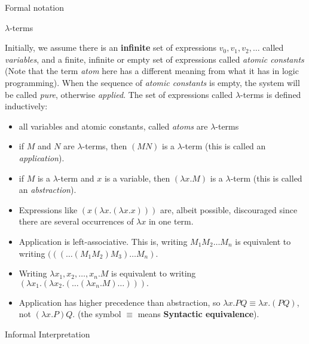 \documentclass{beamer}
\newcommand{\lam}{{$\lambda$}}
\newcommand{\lambdaterms}{{\lam-terms}}
\newcommand{\lambdaterm}{{\lam-term}}
\begin{document}
  \begin{section}{Formal notation}
    \begin{subsection}{\lambdaterms{}}
      \begin{frame}
        Initially, we assume there is an \textbf{infinite} set of expressions $v_0, v_1, v_2, \ldots$ called \textit{variables}, and a finite, infinite or empty set of expressions called \textit{atomic constants} (Note that the term \textit{atom} here has a different meaning from what it has in logic programming). When the sequence of \textit{atomic constants} is empty, the system will be called \textit{pure}, otherwise \textit{applied}. The set of expressions called \lambdaterms{} is defined inductively:
        \begin{itemize}[a]
        \item<1-> all variables and atomic constants, called \textit{atoms} are \lambdaterms{}
        \item<2-> if $M$ and $N$ are \lambdaterms{}, then $(M N)$ is a \lambdaterm{} (this is called an \textit{application}).
        \item<3-> if $M$ is a \lambdaterm{} and $x$ is a variable, then $(\lambda x. M)$ is a \lambdaterm{} (this is called an \textit{abstraction}).
        \end{itemize}
      \end{frame}
      \begin{frame}
        \begin{itemize}
        \item<1->Expressions like $(x (\lambda x. (\lambda x. x)))$ are, albeit possible, discouraged since there are several occurrences of $\lambda x$ in one term.
        \item<2->Application is left-associative. This is, writing $M_1 M_2 \ldots M_n$ is equivalent to writing $(((\ldots(M_1 M_2) M_3 )\ldots M_n)$.
        \item<3->Writing $\lambda x_1,x_2,\ldots,x_n.M$ is equivalent to writing $(\lambda x_1.(\lambda x_2.(\ldots(\lambda x_n.M)\ldots))).$
        \item<4->Application has higher precedence than abstraction, so $\lambda x . P Q \equiv \lambda x . (P Q)$, not $(\lambda x.P)Q$. (the symbol $\equiv$ means \textbf{Syntactic equivalence}).
        \end{itemize}
      \end{frame}
    \end{subsection}
    \begin{subsection}{Informal Interpretation}

\end{subsection}
\end{section}
\end{document}
